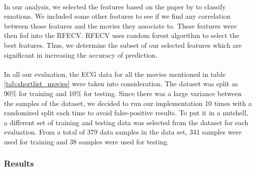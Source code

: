 \paragraph{} In our analysis, we selected the features based on the paper by \citeauthor{zhao_emotion_2016} \cite{zhao_emotion_2016} to classify emotions. We included some other features to see if we find any correlation between those features and the movies they associate to. These features were then fed into the RFECV. RFECV uses random forest algorithm to select the best features. Thus, we determine the subset of our selected features which are significant in increasing the accuracy of prediction.

\paragraph{} In all our evaluation, the ECG data for all the movies mentioned in table \ref{tab:shortlist_movies} were taken into consideration. The dataset was split as 90\% for training and 10\% for testing. Since there was a large variance between the samples of the dataset, we decided to run our implementation 10 times with a randomized split each time to avoid false-positive results. To put it in a nutshell, a different set of training and testing data was selected from the dataset for each evaluation. From a total of 379 data samples in the data set, 341 samples were used for training and 38 samples were used for testing.

\subsubsection{Results}
\label{sec:ecg_analysis_results}
